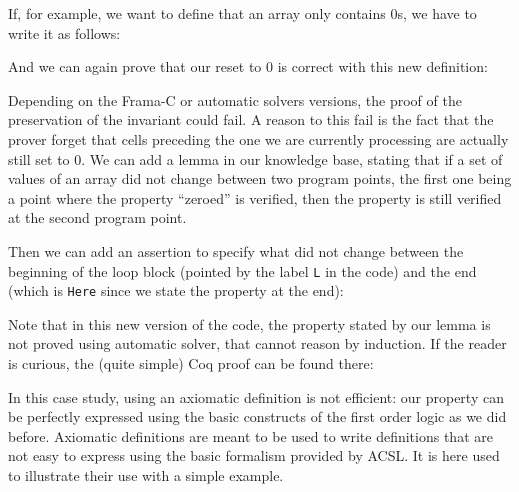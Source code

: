 If, for example, we want to define that an array only contains 0s, we
have to write it as follows:






And we can again prove that our reset to 0 is correct with this new
definition:







Depending on the Frama-C or automatic solvers versions, the proof of the
preservation of the invariant could fail. A reason to this fail is the
fact that the prover forget that cells preceding the one we are
currently processing are actually still set to 0. We can add a lemma in
our knowledge base, stating that if a set of values of an array did not
change between two program points, the first one being a point where the
property ``zeroed'' is verified, then the property is still verified at
the second program point.






Then we can add an assertion to specify what did not change between the
beginning of the loop block (pointed by the label \texttt{L} in the
code) and the end (which is \texttt{Here} since we state the property at
the end):






Note that in this new version of the code, the property stated by our
lemma is not proved using automatic solver, that cannot reason by
induction. If the reader is curious, the (quite simple) Coq proof can be
found there:



\begin{Spoiler}
\end{Spoiler}


In this case study, using an axiomatic definition is not efficient: our
property can be perfectly expressed using the basic constructs of the
first order logic as we did before. Axiomatic definitions are meant to
be used to write definitions that are not easy to express using the
basic formalism provided by ACSL. It is here used to illustrate their
use with a simple example.



